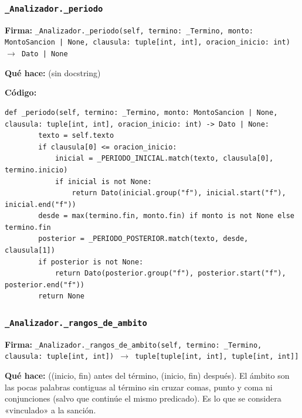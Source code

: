 \documentclass[11pt,a4paper]{article}
\begin{document}
\subsubsection*{\texttt{\_Analizador.\_periodo}}
\textbf{Firma:} \texttt{\_Analizador.\_periodo(self, termino: \_Termino, monto: MontoSancion | None, clausula: tuple[int, int], oracion\_inicio: int) $\rightarrow$ Dato | None}

\textbf{Qué hace:} (sin docstring)

\textbf{Código:}
\begin{lstlisting}
def _periodo(self, termino: _Termino, monto: MontoSancion | None, clausula: tuple[int, int], oracion_inicio: int) -> Dato | None:
        texto = self.texto
        if clausula[0] <= oracion_inicio:
            inicial = _PERIODO_INICIAL.match(texto, clausula[0], termino.inicio)
            if inicial is not None:
                return Dato(inicial.group("f"), inicial.start("f"), inicial.end("f"))
        desde = max(termino.fin, monto.fin) if monto is not None else termino.fin
        posterior = _PERIODO_POSTERIOR.match(texto, desde, clausula[1])
        if posterior is not None:
            return Dato(posterior.group("f"), posterior.start("f"), posterior.end("f"))
        return None
\end{lstlisting}

\subsubsection*{\texttt{\_Analizador.\_rangos\_de\_ambito}}
\textbf{Firma:} \texttt{\_Analizador.\_rangos\_de\_ambito(self, termino: \_Termino, clausula: tuple[int, int]) $\rightarrow$ tuple[tuple[int, int], tuple[int, int]]}

\textbf{Qué hace:} ((inicio, fin) antes del término, (inicio, fin) después). El ámbito son las pocas palabras
contiguas al término sin cruzar comas, punto y coma ni conjunciones (salvo que continúe el
mismo predicado). Es lo que se considera «vinculado» a la sanción.
\end{document}
